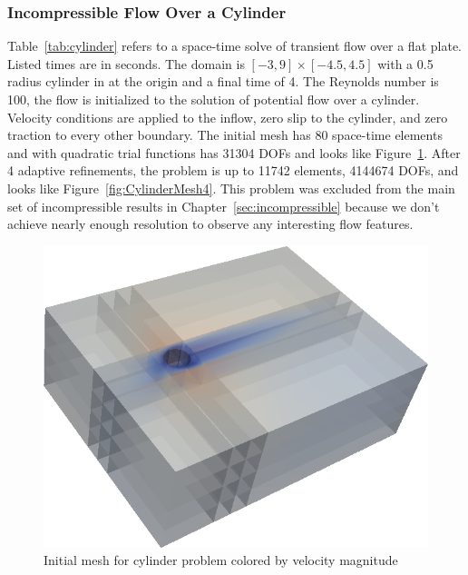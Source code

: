 \documentclass[Dissertation.tex]{subfiles}
\begin{document}
\subsubsection{Incompressible Flow Over a Cylinder}
Table~\ref{tab:cylinder} refers to a space-time solve of transient flow over a flat plate. 
Listed times are in seconds.
The domain is $[-3,9]\times[-4.5,4.5]$ with a 0.5 radius cylinder in at the origin and a final time of 4.
The Reynolds number is 100, the flow is initialized to the solution of potential flow over a cylinder.
Velocity conditions are applied to the inflow, zero slip to the cylinder, and zero traction to every other boundary.
The initial mesh has 80 space-time elements and with quadratic trial functions has 31304 DOFs 
and looks like Figure~\ref{fig:CylinderMesh0}.
After 4 adaptive refinements, the problem is up to 11742 elements, 4144674 DOFs, 
and looks like Figure~\ref{fig:CylinderMesh4}.
This problem was excluded from the main set of incompressible results in Chapter~\ref{sec:incompressible}
because we don't achieve nearly enough resolution to observe any interesting flow features.

\begin{figure}[!ht]
\centering
\includegraphics[width=\textwidth]{Dissertation/Cylinder/Mesh_uMag0.png}
\caption{Initial mesh for cylinder problem colored by velocity magnitude}
\label{fig:CylinderMesh0}
\end{figure}
\end{document}
